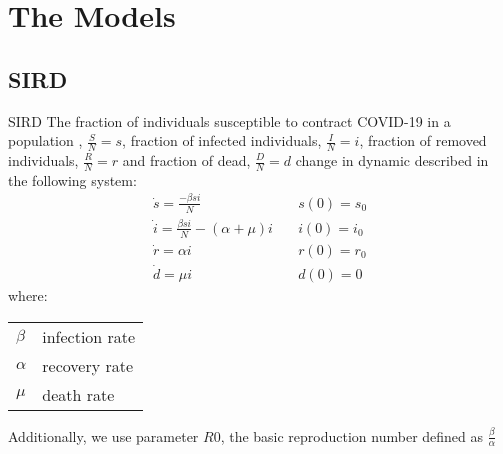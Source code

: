 \documentclass{beamer}
\makeatletter
\newenvironment{conditions}
  {\par\vspace{\abovedisplayskip}\noindent\begin{tabular}{>{$}l<{$} @{${}={}$} l}}
  {\end{tabular}\par\vspace{\belowdisplayskip}}
\makeatother
\begin{document}
\section{The Models}
\subsection{SIRD}
\begin{frame}{SIRD}
The fraction of individuals susceptible to contract COVID-19 in a population , $\frac{S}{N} = s$, fraction of infected individuals, $\frac{I}{N} = i$, fraction of removed individuals, $\frac{R}{N} = r$ and fraction of dead, $\frac{D}{N} = d$ change in dynamic described in the following system: 
\begin{equation}
       \begin{array}{ll}
      \dot{s} = \frac{- \beta s i}{N}  & \quad s(0) = s_0 \\
       \dot{i} = \frac{\beta s i}{N} - (\alpha + \mu)i & \quad i(0) = i_0 \\
       \dot{r} = \alpha i  & \quad r(0) = r_0 \\ 
       \dot{d} = \mu i & \quad d(0) = 0 
        \end{array}
\end{equation}
where:
\begin{conditions}
\beta & infection rate \\
\alpha & recovery rate \\
\mu & death rate \\
\end{conditions}

Additionally, we use parameter $R0$, the basic reproduction number defined as $\frac{\beta}{\alpha}$

\end{frame}
\end{document}
